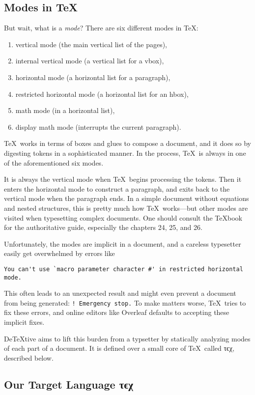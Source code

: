\documentclass[a4paper]{article}
\newcommand*{\tex}{τϵχ}
\begin{document}
\subsection{Modes in \TeX}
But wait, what is a \emph{mode}?
There are six different modes in \TeX\cite{texbook}:
\begin{enumerate}
\item vertical mode (the main vertical list of the pages),
\item internal vertical mode (a vertical list for a vbox),
\item horizontal mode (a horizontal list for a paragraph),
\item restricted horizontal mode (a horizontal list for an hbox),
\item math mode (in a horizontal list),
\item display math mode (interrupts the current paragraph).
\end{enumerate}
\TeX\ works in terms of boxes and glues to compose a document, and it does so by digesting tokens in a sophisticated manner.
In the process, \TeX\ is always in one of the aforementioned six modes.

It is always the vertical mode when \TeX\ begins processing the tokens.
Then it enters the horizontal mode to construct a paragraph, and exits back to the vertical mode when the paragraph ends.
In a simple document without equations and nested structures, this is pretty much how \TeX\ works---but other modes are visited when typesetting complex documents.
One should consult the \TeX{}book\cite{texbook} for the authoritative guide, especially the chapters 24, 25, and 26.

Unfortunately, the modes are implicit in a document, and a careless typesetter easily get overwhelmed by errors like
\begin{verbatim}
You can't use `macro parameter character #' in restricted horizontal mode.
\end{verbatim}
This often leads to an unexpected result and might even prevent a document from being generated: \verb/! Emergency stop./
To make matters worse, \TeX\ tries to fix these errors, and online editors like \textsf{Overleaf} defaults to accepting these implicit fixes.

De\TeX{}tive aims to lift this burden from a typsetter by statically analyzing modes of each part of a document.
It is defined over a small core of \TeX\ called \tex, described below.

\subsection{Our Target Language \tex}
\end{document}
